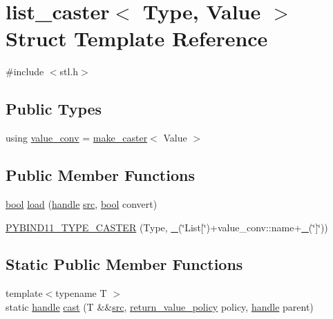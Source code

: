 \hypertarget{structlist__caster}{}\section{list\+\_\+caster$<$ Type, Value $>$ Struct Template Reference}
\label{structlist__caster}


{\ttfamily \#include $<$stl.\+h$>$}

\subsection*{Public Types}
\begin{DoxyCompactItemize}
\item 
using \mbox{\hyperlink{structlist__caster_ac967cd6db186bb9053a3309967afd769}{value\+\_\+conv}} = \mbox{\hyperlink{cast_8h_ab32b52411a6b07420516d79074815713}{make\+\_\+caster}}$<$ Value $>$
\end{DoxyCompactItemize}
\subsection*{Public Member Functions}
\begin{DoxyCompactItemize}
\item 
\mbox{\hyperlink{asdl_8h_af6a258d8f3ee5206d682d799316314b1}{bool}} \mbox{\hyperlink{structlist__caster_a6f4b4e4679fc465e40ef9f45480c3467}{load}} (\mbox{\hyperlink{classhandle}{handle}} \mbox{\hyperlink{_s_d_l__opengl__glext_8h_a72e0fdf0f845ded60b1fada9e9195cd7}{src}}, \mbox{\hyperlink{asdl_8h_af6a258d8f3ee5206d682d799316314b1}{bool}} convert)
\item 
\mbox{\hyperlink{structlist__caster_a88389469e8b23995d7834cc6715ce790}{P\+Y\+B\+I\+N\+D11\+\_\+\+T\+Y\+P\+E\+\_\+\+C\+A\+S\+T\+ER}} (Type, \mbox{\hyperlink{descr_8h_af114703e20c6527e87163eb2798f74b8}{\+\_\+}}(\char`\"{}List\mbox{[}\char`\"{})+value\+\_\+conv\+::name+\mbox{\hyperlink{descr_8h_af114703e20c6527e87163eb2798f74b8}{\+\_\+}}(\char`\"{}\mbox{]}\char`\"{}))
\end{DoxyCompactItemize}
\subsection*{Static Public Member Functions}
\begin{DoxyCompactItemize}
\item 
{\footnotesize template$<$typename T $>$ }\\static \mbox{\hyperlink{classhandle}{handle}} \mbox{\hyperlink{structlist__caster_add7c216960ed11015507b9c4356d088d}{cast}} (T \&\&\mbox{\hyperlink{_s_d_l__opengl__glext_8h_a72e0fdf0f845ded60b1fada9e9195cd7}{src}}, \mbox{\hyperlink{detail_2common_8h_adde72ab1fb0dd4b48a5232c349a53841}{return\+\_\+value\+\_\+policy}} policy, \mbox{\hyperlink{classhandle}{handle}} parent)
\end{DoxyCompactItemize}


